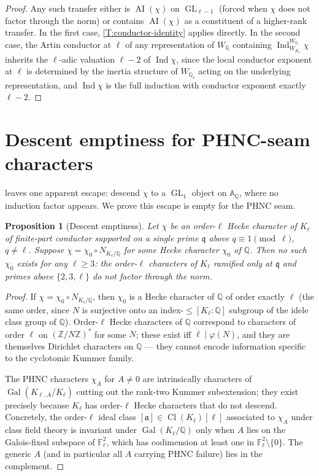 \documentclass[11pt]{article}
\newtheorem{proposition}{Proposition}
\newcommand{\Z}{\mathbb Z}
\newcommand{\Q}{\mathbb Q}
\newcommand{\F}{\mathbb F}
\newcommand{\A}{\mathbb A}
\newcommand{\Gal}{\operatorname{Gal}}
\newcommand{\Ind}{\operatorname{Ind}}
\newcommand{\AI}{\operatorname{AI}}
\newcommand{\Cl}{\operatorname{Cl}}
\newcommand{\GL}{\operatorname{GL}}
\begin{document}
\begin{proof}
Any such transfer either is \(\AI(\chi)\) on \(\GL_{\ell-1}\) (forced when \(\chi\) does not factor through the norm) or contains \(\AI(\chi)\) as a constituent of a higher-rank transfer.  In the first case, \cref{T:conductor-identity} applies directly.  In the second case, the Artin conductor at \(\ell\) of any representation of \(W_\Q\) containing \(\Ind_{W_{K_\ell}}^{W_\Q}\chi\) inherits the \(\ell\)-adic valuation \(\ell-2\) of \(\Ind\chi\), since the local conductor exponent at \(\ell\) is determined by the inertia structure of \(W_{\Q_\ell}\) acting on the underlying representation, and \(\Ind\chi\) is the full induction with conductor exponent exactly \(\ell-2\).
\end{proof}

\section{Descent emptiness for PHNC-seam characters}

 leaves one apparent escape: descend \(\chi\) to a \(\GL_1\) object on \(\A_\Q\), where no induction factor appears.  We prove this escape is empty for the PHNC seam.

\begin{proposition}[Descent emptiness]\label{P:descent-empty}
Let \(\chi\) be an order-\(\ell\) Hecke character of \(K_\ell\) of finite-part conductor supported on a single prime \(\mathfrak q\) above \(q\equiv 1\pmod\ell\), \(q\ne\ell\).  Suppose \(\chi=\chi_0\circ N_{K_\ell/\Q}\) for some Hecke character \(\chi_0\) of \(\Q\).  Then no such \(\chi_0\) exists for any \(\ell\ge 3\): the order-\(\ell\) characters of \(K_\ell\) ramified only at \(\mathfrak q\) and primes above \(\{2,3,\ell\}\) do not factor through the norm.
\end{proposition}

\begin{proof}
If \(\chi=\chi_0\circ N_{K_\ell/\Q}\), then \(\chi_0\) is a Hecke character of \(\Q\) of order exactly \(\ell\) (the same order, since \(N\) is surjective onto an index-\(\le[K_\ell:\Q]\) subgroup of the idele class group of \(\Q\)).  Order-\(\ell\) Hecke characters of \(\Q\) correspond to characters of order \(\ell\) on \((\Z/N\Z)^*\) for some \(N\); these exist iff \(\ell\mid\varphi(N)\), and they are themselves Dirichlet characters on \(\Q\) — they cannot encode information specific to the cyclotomic Kummer family.

The PHNC characters \(\chi_A\) for \(A\ne 0\) are intrinsically characters of \(\Gal(K_{\ell,A}/K_\ell)\) cutting out the rank-two Kummer subextension; they exist precisely because \(K_\ell\) has order-\(\ell\) Hecke characters that do not descend.  Concretely, the order-\(\ell\) ideal class \([\mathfrak a]\in\Cl(K_\ell)[\ell]\) associated to \(\chi_A\) under class field theory is invariant under \(\Gal(K_\ell/\Q)\) only when \(A\) lies on the Galois-fixed subspace of \(\F_\ell^2\), which has codimension at least one in \(\F_\ell^2\setminus\{0\}\).  The generic \(A\) (and in particular all \(A\) carrying PHNC failure) lies in the complement.
\end{proof}
\end{document}

